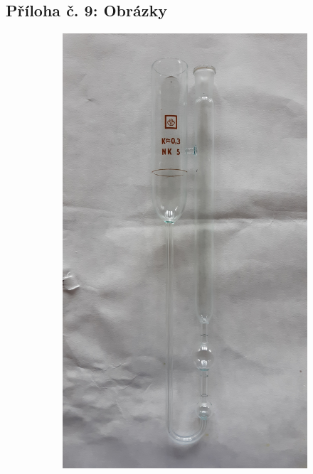 \documentclass[12pt]{article}
\begin{document}
\newpage%
\subsection*{Příloha č. 9: Obrázky}%

\begin{figure}[h!]
    \begin{subfigure}[b]{.5\textwidth}
        \includegraphics[angle = 270, width = \textwidth]{prilohy/muj_ostwald1.jpg}

\end{subfigure}
\end{figure}
\end{document}
